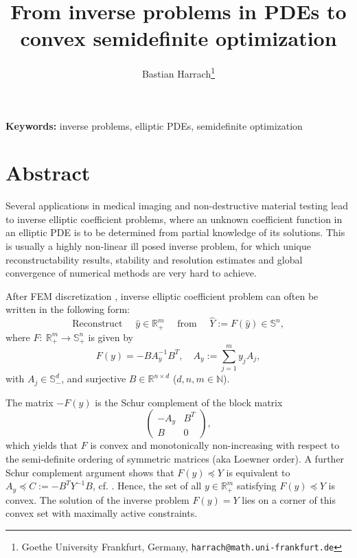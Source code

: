 \documentclass[11pt]{article}
\title{\bfseries From inverse problems in PDEs to convex semidefinite optimization}
\author{
Bastian Harrach\thanks{Goethe University Frankfurt, Germany,
\texttt{harrach@math.uni-frankfurt.de}}
}
\date{}
\begin{document}
\maketitle

\vspace{-1em}

\noindent
\textbf{Keywords:}
inverse problems, elliptic PDEs, semidefinite optimization

\vspace{0.5em}


\vspace{1em}

\section*{Abstract}

Several applications in medical imaging and non-destructive material testing lead to inverse elliptic coefficient problems, where an unknown coefficient function in an elliptic PDE is to be determined from partial knowledge of its solutions. This is usually a highly non-linear ill posed inverse problem, for which unique reconstructability results, stability and resolution estimates and global convergence of numerical methods are very hard to achieve.

After FEM discretization \cite{Harrach2021}, inverse elliptic coefficient problem can often be written in the following form:
\begin{equation*}
\text{Reconstruct } \quad \hat y\in \mathbb{R}^m_+ \quad \text{ from } \quad \hat Y:=F(\hat y)\in \mathbb{S}^n,
\end{equation*}
where $F:\ \mathbb{R}_+^m\to \mathbb{S}^n_+$ is given by
\[
F(y)=-B  A_y^{-1} B^T,\quad A_y:=\sum_{j=1}^m y_j A_j,
\]
with $A_j\in \mathbb{S}^d_-$, and surjective $B\in \mathbb{R}^{n\times d}$ ($d,n,m\in \mathbb{N}$). 

The matrix $-F(y)$ is the Schur complement of the block matrix
\[
\begin{pmatrix} -A_y & B^T\\ B & 0\end{pmatrix},
\]
which yields that $F$ is convex and monotonically non-increasing with respect to the semi-definite ordering of symmetric matrices (aka Loewner order). 
A further Schur complement argument shows that $F(y)\preceq Y$ is equivalent to $A_y\preceq C:=-B^T Y^{-1} B$, cf. \cite{BrojatschHarrach2025}. Hence, 
the set of all $y\in \mathbb{R}^m_+$ satisfying $F(y)\preceq Y$ is convex. The solution of the inverse problem $F(y)=Y$ lies on a corner of this convex set with maximally active constraints. 
\end{document}
